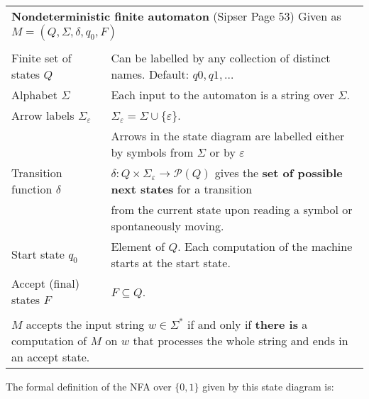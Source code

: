 \documentclass[12pt, oneside]{article}
\begin{document}
\begin{center}
\begin{tabular}{|ll|}
\hline
\multicolumn{2}{|l|}{{\bf Nondeterministic finite automaton}  (Sipser Page 53) Given as $M = (Q, \Sigma, \delta, q_0, F)$}\\
& \\
Finite set of states $Q$  & Can  be labelled by any collection  of distinct names. Default: $q0, q1, \ldots$  \\
Alphabet $\Sigma$ &  Each input to the automaton is a string over  $\Sigma$. \\
Arrow labels $\Sigma_\varepsilon$ &  $\Sigma_\varepsilon = \Sigma \cup \{ \varepsilon\}$. \\
&  Arrows 
in the state diagram are labelled either by symbols from $\Sigma$ or by $\varepsilon$ \\
Transition function $\delta$  & $\delta: Q \times \Sigma_{\varepsilon} \to \mathcal{P}(Q)$
gives the {\bf set of possible next states} for a transition \\
&  from the current state upon reading a symbol or spontaneously moving.\\
Start state $q_0$ & Element of $Q$.  Each computation of the machine starts at the  start  state.\\
Accept (final) states $F$ & $F \subseteq  Q$.\\
& \\
\multicolumn{2}{|p{\textwidth}|}{$M$ accepts the input string $w \in \Sigma^*$ if and only if {\bf there is} a computation of $M$ on 
$w$ that processes the whole string and ends in an
accept state.}\\
\hline
\end{tabular}
\end{center}

The formal definition of the NFA over $\{0,1\}$ given by this state diagram is: 

\begin{center}
 \end{center}
\end{document}
